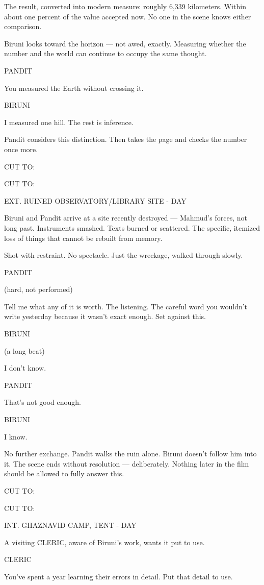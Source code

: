 \documentclass[12pt]{article}
\newcommand{\sceneheading}[1]{%
  \needspace{4\baselineskip}%
  \par\vspace{1\baselineskip}\noindent #1\par\vspace{0.6\baselineskip}%
}
\newcommand{\action}[1]{%
  \par\noindent #1\par\vspace{0.6\baselineskip}%
}
\newcommand{\transition}[1]{%
  \par\vspace{0.3\baselineskip}%
  \ifthenelse{\equal{#1}{FADE IN:}}%
    {\noindent #1\par}%
    {\noindent\hfill #1\par}%
  \vspace{0.6\baselineskip}%
}
\newcommand{\charcue}[1]{%
  \needspace{3\baselineskip}%
  \par\vspace{0.3\baselineskip}\noindent\hspace*{2.2in}#1\par%
}
\newenvironment{dialogue}{%
  \begin{list}{}{%
    \setlength{\leftmargin}{1.1in}%
    \setlength{\rightmargin}{1.6in}%
    \setlength{\listparindent}{0pt}%
    \setlength{\itemindent}{0pt}%
    \setlength{\parsep}{0pt}%
    \setlength{\itemsep}{0pt}%
    \setlength{\topsep}{0pt}%
  }\item[]%
}{%
  \end{list}\vspace{0.4\baselineskip}%
}
\newcommand{\parenthetical}[1]{%
  \hspace*{-0.4in}\hspace*{1.1in}(#1)\par%
}
\begin{document}
\action{The result, converted into modern measure: roughly 6,339 kilometers. Within about one percent of the value accepted now. No one in the scene knows either comparison.}
\action{Biruni looks toward the horizon --- not awed, exactly. Measuring whether the number and the world can continue to occupy the same thought.}
\charcue{PANDIT}
\begin{dialogue}
You measured the Earth without crossing it.\\
\end{dialogue}
\charcue{BIRUNI}
\begin{dialogue}
I measured one hill. The rest is inference.\\
\end{dialogue}
\action{Pandit considers this distinction. Then takes the page and checks the number once more.}
\transition{CUT TO:}
\sceneheading{EXT. RUINED OBSERVATORY/LIBRARY SITE - DAY}
\action{Biruni and Pandit arrive at a site recently destroyed --- Mahmud's forces, not long past. Instruments smashed. Texts burned or scattered. The specific, itemized loss of things that cannot be rebuilt from memory.}
\action{Shot with restraint. No spectacle. Just the wreckage, walked through slowly.}
\charcue{PANDIT}
\begin{dialogue}
\parenthetical{hard, not performed}
Tell me what any of it is worth. The listening. The careful word you wouldn't write yesterday because it wasn't exact enough. Set against this.\\
\end{dialogue}
\charcue{BIRUNI}
\begin{dialogue}
\parenthetical{a long beat}
I don't know.\\
\end{dialogue}
\charcue{PANDIT}
\begin{dialogue}
That's not good enough.\\
\end{dialogue}
\charcue{BIRUNI}
\begin{dialogue}
I know.\\
\end{dialogue}
\action{No further exchange. Pandit walks the ruin alone. Biruni doesn't follow him into it. The scene ends without resolution --- deliberately. Nothing later in the film should be allowed to fully answer this.}
\transition{CUT TO:}
\sceneheading{INT. GHAZNAVID CAMP, TENT - DAY}
\action{A visiting CLERIC, aware of Biruni's work, wants it put to use.}
\charcue{CLERIC}
\begin{dialogue}
You've spent a year learning their errors in detail. Put that detail to use.\\
\end{dialogue}
\end{document}
